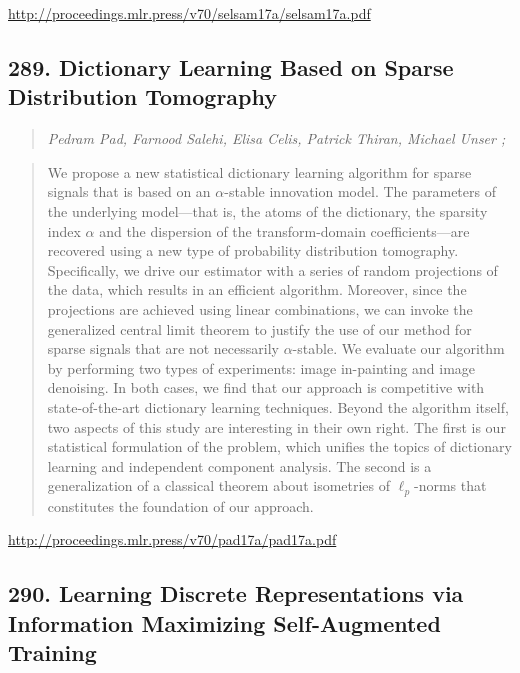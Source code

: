 \documentclass{article}
\begin{document}
\href{http://proceedings.mlr.press/v70/selsam17a/selsam17a.pdf}{http://proceedings.mlr.press/v70/selsam17a/selsam17a.pdf}

\subsection{289. Dictionary Learning Based on Sparse Distribution Tomography}

\begin{quote}
\footnotesize{\textit{Pedram Pad, Farnood Salehi, Elisa Celis, Patrick Thiran, Michael Unser ;}}

\end{quote}

\begin{quote}
    We propose a new statistical dictionary learning algorithm for sparse signals that is based on an $\alpha$-stable innovation model. The parameters of the underlying model—that is, the atoms of the dictionary, the sparsity index $\alpha$ and the dispersion of the transform-domain coefficients—are recovered using a new type of probability distribution tomography. Specifically, we drive our estimator with a series of random projections of the data, which results in an efficient algorithm. Moreover, since the projections are achieved using linear combinations, we can invoke the generalized central limit theorem to justify the use of our method for sparse signals that are not necessarily $\alpha$-stable. We evaluate our algorithm by performing two types of experiments: image in-painting and image denoising. In both cases, we find that our approach is competitive with state-of-the-art dictionary learning techniques. Beyond the algorithm itself, two aspects of this study are interesting in their own right. The first is our statistical formulation of the problem, which unifies the topics of dictionary learning and independent component analysis. The second is a generalization of a classical theorem about isometries of $\ell_p$-norms that constitutes the foundation of our approach.  
\end{quote}

\href{http://proceedings.mlr.press/v70/pad17a/pad17a.pdf}{http://proceedings.mlr.press/v70/pad17a/pad17a.pdf}

\subsection{290. Learning Discrete Representations via Information Maximizing Self-Augmented Training}
\end{document}
